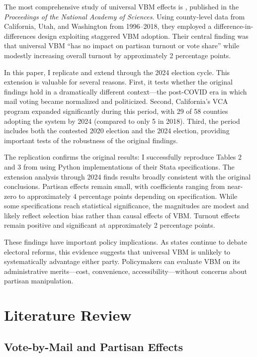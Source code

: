 \documentclass[12pt]{article}
\begin{document}
The most comprehensive study of universal VBM effects is \citet{thompson2020universal}, published in the \textit{Proceedings of the National Academy of Sciences}. Using county-level data from California, Utah, and Washington from 1996--2018, they employed a difference-in-differences design exploiting staggered VBM adoption. Their central finding was that universal VBM ``has no impact on partisan turnout or vote share'' while modestly increasing overall turnout by approximately 2 percentage points.

In this paper, I replicate and extend \citet{thompson2020universal} through the 2024 election cycle. This extension is valuable for several reasons. First, it tests whether the original findings hold in a dramatically different context---the post-COVID era in which mail voting became normalized and politicized. Second, California's VCA program expanded significantly during this period, with 29 of 58 counties adopting the system by 2024 (compared to only 5 in 2018). Third, the period includes both the contested 2020 election and the 2024 election, providing important tests of the robustness of the original findings.

The replication confirms the original results: I successfully reproduce Tables 2 and 3 from \citet{thompson2020universal} using Python implementations of their Stata specifications. The extension analysis through 2024 finds results broadly consistent with the original conclusions. Partisan effects remain small, with coefficients ranging from near-zero to approximately 4 percentage points depending on specification. While some specifications reach statistical significance, the magnitudes are modest and likely reflect selection bias rather than causal effects of VBM. Turnout effects remain positive and significant at approximately 2 percentage points.

These findings have important policy implications. As states continue to debate electoral reforms, this evidence suggests that universal VBM is unlikely to systematically advantage either party. Policymakers can evaluate VBM on its administrative merits---cost, convenience, accessibility---without concerns about partisan manipulation.

\section{Literature Review}

\subsection{Vote-by-Mail and Partisan Effects}
\end{document}
